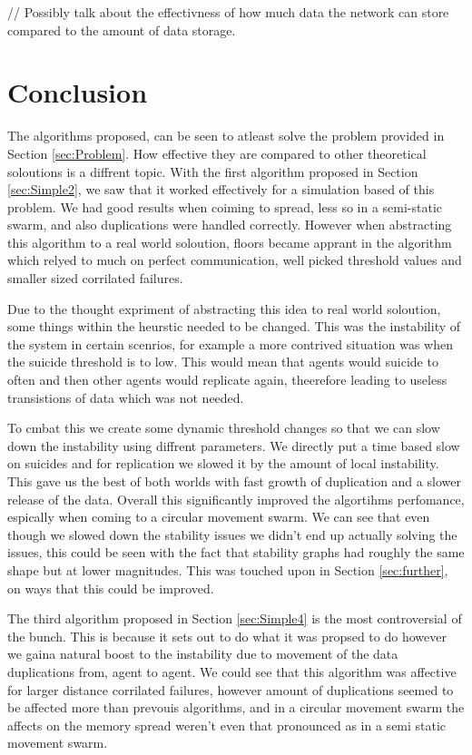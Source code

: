 \documentclass{UoYCSproject}
\begin{document}
// Possibly talk about the effectivness of how much data the network can store compared to the amount of data storage.

\section{Conclusion}
\label{sec:conc}

The algorithms proposed, can be seen to atleast solve the problem provided in Section \ref{sec:Problem}.
How effective they are compared to other theoretical soloutions is a diffrent topic.
With the first algorithm proposed in Section \ref{sec:Simple2}, we saw that it worked effectively for a simulation based of this problem.
We had good results when coiming to spread, less so in a semi-static swarm, and also duplications were handled correctly.
However when abstracting this algorithm to a real world soloution, floors became apprant in the algorithm which relyed to much on perfect communication, well picked threshold values and smaller sized corrilated failures.

Due to the thought expriment of abstracting this idea to real world soloution, some things within the heurstic needed to be changed.
This was the instability of the system in certain scenrios, for example a more contrived situation was when the suicide threshold is to low.
This would mean that agents would suicide to often and then other agents would replicate again, theerefore leading to useless transistions of data which was not needed.

To cmbat this we create some dynamic threshold changes so that we can slow down the instability using diffrent parameters.
We directly put a time based slow on suicides and for replication we slowed it by the amount of local instability.
This gave us the best of both worlds with fast growth of duplication and a slower release of the data.
Overall this significantly improved the algortihms perfomance, espically when coming to a circular movement swarm.
We can see that even though we slowed down the stability issues we didn't end up actually solving the issues, this could be seen with the fact that stability graphs had roughly the same shape but at lower magnitudes.
This was touched upon in Section \ref{sec:further}, on ways that this could be improved.

The third algorithm proposed in Section \ref{sec:Simple4} is the most controversial of the bunch.
This is because it sets out to do what it was propsed to do however we gaina natural boost to the instability due to movement of the data duplications from, agent to agent.
We could see that this algorithm was affective for larger distance corrilated failures, however amount of duplications seemed to be affected more than prevouis algorithms, and in a circular movement swarm the affects on the memory spread weren't even that pronounced as in a semi static movement swarm.
\end{document}
